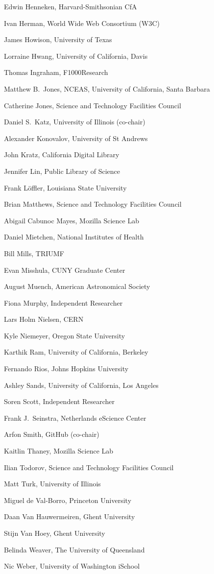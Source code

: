 \documentclass[11pt, oneside]{amsart}
\begin{document}
Edwin Henneken, Harvard-Smithsonian CfA

Ivan Herman, World Wide Web Consortium (W3C)

James Howison, University of Texas

Lorraine Hwang, University of California,  Davis

Thomas Ingraham, F1000Research

Matthew B.~Jones, NCEAS, University of California,  Santa Barbara

Catherine Jones, Science and Technology Facilities Council

Daniel S.~Katz, University of Illinois (co-chair)

Alexander Konovalov, University of St Andrews

John Kratz, California Digital Library

Jennifer Lin, Public Library of Science

Frank L\"offler, Louisiana State University

Brian Matthews, Science and Technology Facilities Council

Abigail Cabunoc Mayes, Mozilla Science Lab

Daniel Mietchen, National Institutes of Health

Bill Mills, TRIUMF

Evan Misshula, CUNY Graduate Center

August Muench, American Astronomical Society

Fiona Murphy, Independent Researcher

Lars Holm Nielsen, CERN

Kyle Niemeyer, Oregon State University

Karthik Ram, University of California, Berkeley

Fernando Rios, Johns Hopkins University

Ashley Sands, University of California, Los Angeles

Soren Scott, Independent Researcher

Frank J.~Seinstra, Netherlands eScience Center

Arfon Smith, GitHub (co-chair)

Kaitlin Thaney, Mozilla Science Lab

Ilian Todorov, Science and Technology Facilities Council

Matt Turk, University of Illinois

Miguel de Val-Borro, Princeton University

Daan Van Hauwermeiren, Ghent University

Stijn Van Hoey, Ghent University

Belinda Weaver, The University of Queensland

Nic Weber, University of Washington iSchool



\end{document}
